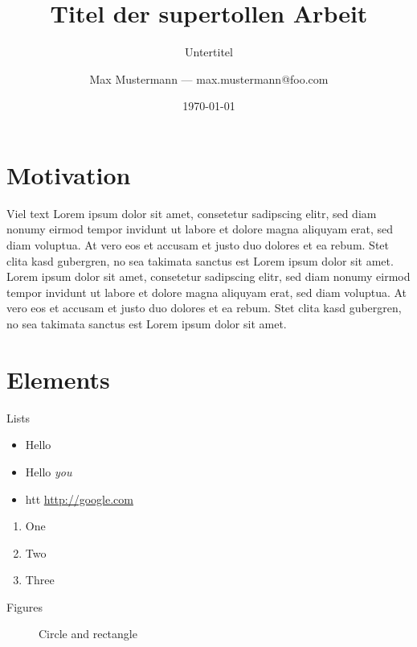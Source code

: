 \documentclass[compress]{beamer}
\title{Titel der supertollen Arbeit}
\subtitle{Untertitel}
\date{\today}
\author{Max Mustermann --- max.mustermann@foo.com}
\institute{Institut für so und so\\Universtität Bla}
\begin{document}
\maketitle


\section{Motivation}

\begin{frame}{Viel text}
Lorem ipsum dolor sit amet, consetetur sadipscing elitr, sed diam nonumy eirmod
tempor invidunt ut labore et dolore magna aliquyam erat, sed diam voluptua. At
vero eos et accusam et justo duo dolores et ea rebum. Stet clita kasd gubergren,
no sea takimata sanctus est Lorem ipsum dolor sit amet. Lorem ipsum dolor sit
amet, consetetur sadipscing elitr, sed diam nonumy eirmod tempor invidunt ut
labore et dolore magna aliquyam erat, sed diam voluptua. At vero eos et accusam
et justo duo dolores et ea rebum. Stet clita kasd gubergren, no sea takimata
sanctus est Lorem ipsum dolor sit amet.
\end{frame}


\section{Elements}

\begin{frame}{Lists}
  \begin{itemize}
    \item Hello
    \item Hello \emph{you}
    \item htt \url{http://google.com}
  \end{itemize}

  \begin{enumerate}
    \item One
    \item Two
    \item Three
  \end{enumerate}
\end{frame}

\begin{frame}{Figures}
  \begin{figure}
    \caption{Circle and rectangle}
  \end{figure}
\end{frame}
\end{document}
